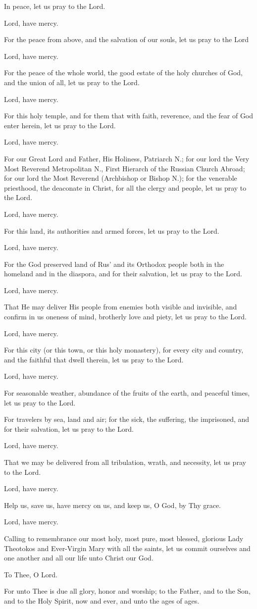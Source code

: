 \documentclass[14pt]{memoir}
\providecommand\sbseries{\fontseries{sb}\selectfont}
\newcommand{\priest}{\mdseries \item[\textsb{Priest}]}
\newcommand{\deacon}{\mdseries \item[\textsb{Deacon}]}
\newcommand{\choir}{\normalfont\sbseries \item[\textsb{\textsc{Choir}}]}
\newenvironment{liturgicaltext}{
    \begin{description}[labelwidth=4em,leftmargin =\dimexpr\labelwidth+\labelsep\relax]
    }
    {
    \end{description}
}
\begin{document}
\begin{liturgicaltext}
    \deacon In peace, let us pray to the Lord.
    \choir Lord, have mercy.
    \deacon For the peace from above, and the salvation of our souls, let us pray to the Lord
    \choir Lord, have mercy.
    \deacon For the peace of the whole world, the good estate of the holy churches of God, and the union of all, let us pray to the Lord.
    \choir Lord, have mercy.
    \deacon For this holy temple, and for them that with faith, reverence, and the fear of God enter herein, let us pray to the Lord.
    \choir Lord, have mercy.
    \deacon For our Great Lord and Father, His Holiness, Patriarch N.; for our lord the Very Most Reverend Metropolitan N., First Hierarch of the Russian Church Abroad; for our lord the Most Reverend (Archbishop or Bishop N.); for the venerable priesthood, the deaconate in Christ, for all the clergy and people, let us pray to the Lord.
    \choir Lord, have mercy.
    \deacon For this land, its authorities and armed forces, let us pray to the Lord.
    \choir Lord, have mercy.
    \deacon For the God preserved land of Rus' and its Orthodox people both in the homeland and in the diaspora, and for their salvation, let us pray to the Lord.
    \choir Lord, have mercy.
    \deacon That He may deliver His people from enemies both visible and invisible, and confirm in us oneness of mind, brotherly love and piety, let us pray to the Lord.
    \choir Lord, have mercy.
    \deacon For this city (or this town, or this holy monastery), for every city and country, and the faithful that dwell therein, let us pray to the Lord.
    \choir Lord, have mercy.
    \deacon For seasonable weather, abundance of the fruits of the earth, and peaceful times, let us pray to the Lord.
    \deacon For travelers by sea, land and air; for the sick, the suffering, the imprisoned, and for their salvation, let us pray to the Lord.
    \choir Lord, have mercy.
    \deacon That we may be delivered from all tribulation, wrath, and necessity, let us pray to the Lord.
    \choir Lord, have mercy.
    \deacon Help us, save us, have mercy on us, and keep us, O God, by Thy grace.
    \choir Lord, have mercy.
    \deacon Calling to remembrance our most holy, most pure, most blessed, glorious Lady Theotokos and Ever-Virgin Mary with all the saints, let us commit ourselves and one another and all our life unto Christ our God.
    \choir To Thee, O Lord.
    \priest For unto Thee is due all glory, honor and worship; to the Father, and to the Son, and to the Holy Spirit, now and ever, and unto the ages of ages.\normalfont

 \end{liturgicaltext}

\lipsum[2-4]
\end{document}
